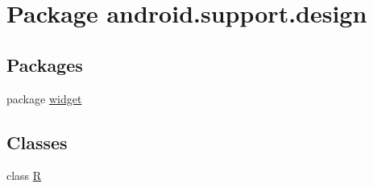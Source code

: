\hypertarget{namespaceandroid_1_1support_1_1design}{
\section{Package android.support.design}
\label{namespaceandroid_1_1support_1_1design}
}
\subsection*{Packages}
\begin{CompactItemize}
\item 
package \hyperlink{namespaceandroid_1_1support_1_1design_1_1widget}{widget}
\end{CompactItemize}
\subsection*{Classes}
\begin{CompactItemize}
\item 
class \hyperlink{classandroid_1_1support_1_1design_1_1_r}{R}
\end{CompactItemize}
